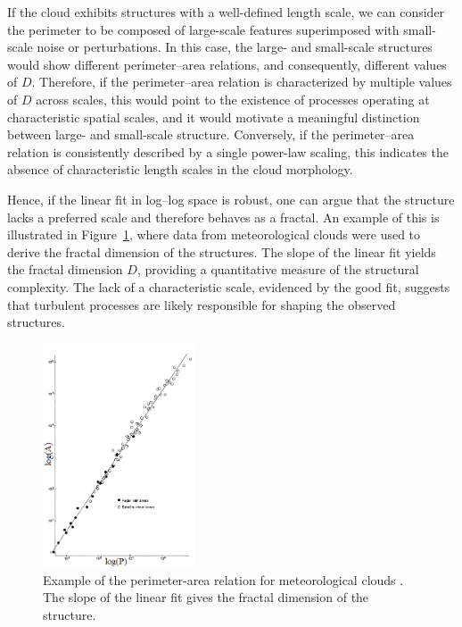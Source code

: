 If the cloud exhibits structures with a well-defined length scale, we can consider the perimeter to be composed of large-scale features superimposed with small-scale noise or perturbations. In this case, the large- and small-scale structures would show different perimeter–area relations, and consequently, different values of $D$. Therefore, if the perimeter–area relation is characterized by multiple values of $D$ across scales, this would point to the existence of processes operating at characteristic spatial scales, and it would motivate a meaningful distinction between large- and small-scale structure. Conversely, if the perimeter–area relation is consistently described by a single power-law scaling, this indicates the absence of characteristic length scales in the cloud morphology.

Hence, if the linear fit in log–log space is robust, one can argue that the structure lacks a preferred scale and therefore behaves as a fractal. An example of this is illustrated in Figure~\ref{fig:perimeter_area_example}, where data from meteorological clouds were used to derive the fractal dimension of the structures. The slope of the linear fit yields the fractal dimension $D$, providing a quantitative measure of the structural complexity. The lack of a characteristic scale, evidenced by the good fit, suggests that turbulent processes are likely responsible for shaping the observed structures.

\begin{figure}[t]
    \centering
    \includegraphics[width=0.4\textwidth]{figures/lovejoy.png}
    \caption{Example of the perimeter-area relation for meteorological clouds \cite{lovejoy1982area}. The slope of the linear fit gives the fractal dimension of the structure.}
    \label{fig:perimeter_area_example}
\end{figure}

